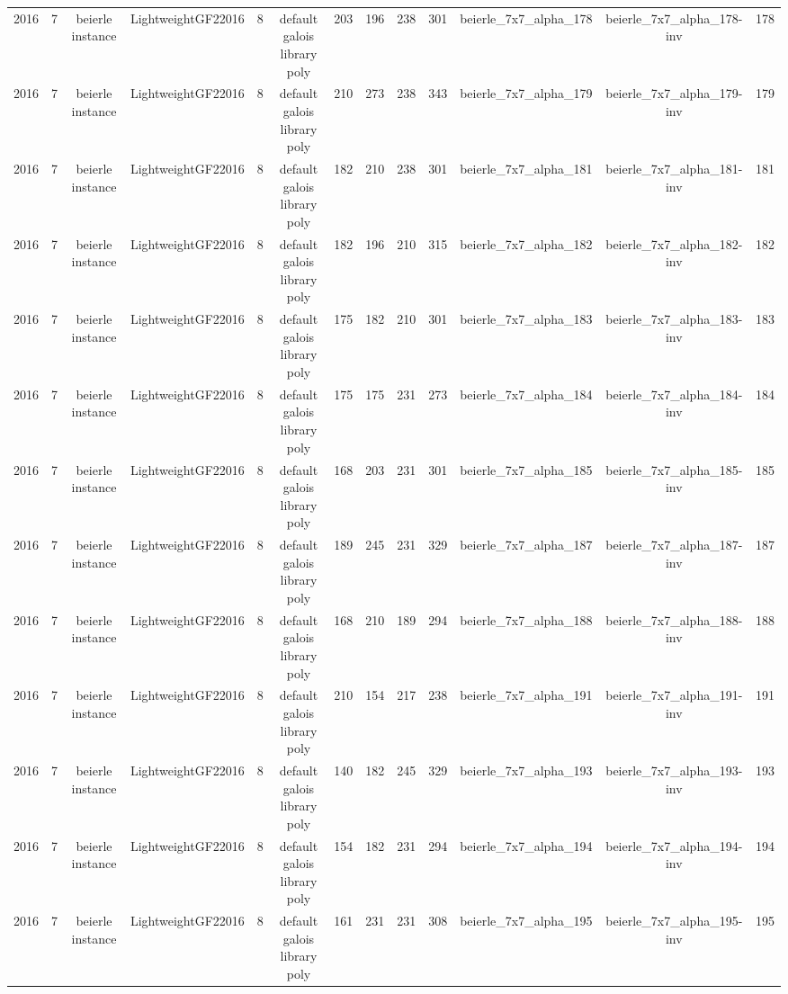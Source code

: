 \begin{tabular}{c c c c c c c c c c c c c}
2016 & 7 & beierle instance & LightweightGF22016 & 8 & default galois library poly & 203 & 196 & 238 & 301 & beierle_7x7_alpha_178 & beierle_7x7_alpha_178-inv & 178 \\
2016 & 7 & beierle instance & LightweightGF22016 & 8 & default galois library poly & 210 & 273 & 238 & 343 & beierle_7x7_alpha_179 & beierle_7x7_alpha_179-inv & 179 \\
2016 & 7 & beierle instance & LightweightGF22016 & 8 & default galois library poly & 182 & 210 & 238 & 301 & beierle_7x7_alpha_181 & beierle_7x7_alpha_181-inv & 181 \\
2016 & 7 & beierle instance & LightweightGF22016 & 8 & default galois library poly & 182 & 196 & 210 & 315 & beierle_7x7_alpha_182 & beierle_7x7_alpha_182-inv & 182 \\
2016 & 7 & beierle instance & LightweightGF22016 & 8 & default galois library poly & 175 & 182 & 210 & 301 & beierle_7x7_alpha_183 & beierle_7x7_alpha_183-inv & 183 \\
2016 & 7 & beierle instance & LightweightGF22016 & 8 & default galois library poly & 175 & 175 & 231 & 273 & beierle_7x7_alpha_184 & beierle_7x7_alpha_184-inv & 184 \\
2016 & 7 & beierle instance & LightweightGF22016 & 8 & default galois library poly & 168 & 203 & 231 & 301 & beierle_7x7_alpha_185 & beierle_7x7_alpha_185-inv & 185 \\
2016 & 7 & beierle instance & LightweightGF22016 & 8 & default galois library poly & 189 & 245 & 231 & 329 & beierle_7x7_alpha_187 & beierle_7x7_alpha_187-inv & 187 \\
2016 & 7 & beierle instance & LightweightGF22016 & 8 & default galois library poly & 168 & 210 & 189 & 294 & beierle_7x7_alpha_188 & beierle_7x7_alpha_188-inv & 188 \\
2016 & 7 & beierle instance & LightweightGF22016 & 8 & default galois library poly & 210 & 154 & 217 & 238 & beierle_7x7_alpha_191 & beierle_7x7_alpha_191-inv & 191 \\
2016 & 7 & beierle instance & LightweightGF22016 & 8 & default galois library poly & 140 & 182 & 245 & 329 & beierle_7x7_alpha_193 & beierle_7x7_alpha_193-inv & 193 \\
2016 & 7 & beierle instance & LightweightGF22016 & 8 & default galois library poly & 154 & 182 & 231 & 294 & beierle_7x7_alpha_194 & beierle_7x7_alpha_194-inv & 194 \\
2016 & 7 & beierle instance & LightweightGF22016 & 8 & default galois library poly & 161 & 231 & 231 & 308 & beierle_7x7_alpha_195 & beierle_7x7_alpha_195-inv & 195 \\

\end{tabular}
